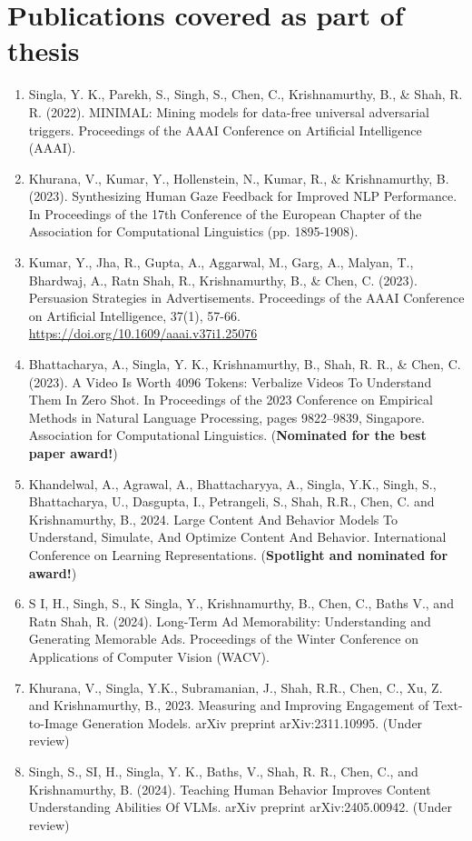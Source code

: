 \chapter*{Publications covered as part of thesis}
\begin{enumerate}
    \item Singla, Y. K., Parekh, S., Singh, S., Chen, C., Krishnamurthy, B., \& Shah, R. R. (2022). MINIMAL: Mining models for data-free universal adversarial triggers. Proceedings of the AAAI Conference on Artificial Intelligence (AAAI).

    \item Khurana, V., Kumar, Y., Hollenstein, N., Kumar, R., \& Krishnamurthy, B. (2023). Synthesizing Human Gaze Feedback for Improved NLP Performance. In Proceedings of the 17th Conference of the European Chapter of the Association for Computational Linguistics (pp. 1895-1908).
    
    \item Kumar, Y., Jha, R., Gupta, A., Aggarwal, M., Garg, A., Malyan, T., Bhardwaj, A., Ratn Shah, R., Krishnamurthy, B., \& Chen, C. (2023). Persuasion Strategies in Advertisements. Proceedings of the AAAI Conference on Artificial Intelligence, 37(1), 57-66. \url{https://doi.org/10.1609/aaai.v37i1.25076}

    \item Bhattacharya, A., Singla, Y. K., Krishnamurthy, B., Shah, R. R., \& Chen, C. (2023). A Video Is Worth 4096 Tokens: Verbalize Videos To Understand Them In Zero Shot. In Proceedings of the 2023 Conference on Empirical Methods in Natural Language Processing, pages 9822–9839, Singapore. Association for Computational Linguistics. (\textbf{Nominated for the best paper award!})

    \item Khandelwal, A., Agrawal, A., Bhattacharyya, A., Singla, Y.K., Singh, S., Bhattacharya, U., Dasgupta, I., Petrangeli, S., Shah, R.R., Chen, C. and Krishnamurthy, B., 2024. Large Content And Behavior Models To Understand, Simulate, And Optimize Content And Behavior. International Conference on Learning Representations. (\textbf{Spotlight and nominated for award!})

    \item  S I, H., Singh, S., K Singla, Y., Krishnamurthy, B., Chen, C., Baths V., and Ratn Shah, R. (2024). Long-Term Ad Memorability: Understanding and Generating Memorable Ads. Proceedings of the Winter Conference on Applications of Computer Vision (WACV).

    \item Khurana, V., Singla, Y.K., Subramanian, J., Shah, R.R., Chen, C., Xu, Z. and Krishnamurthy, B., 2023. Measuring and Improving Engagement of Text-to-Image Generation Models. arXiv preprint arXiv:2311.10995. (Under review)

    \item Singh, S., SI, H., Singla, Y. K., Baths, V., Shah, R. R., Chen, C., and Krishnamurthy, B. (2024). Teaching Human Behavior Improves Content Understanding Abilities Of VLMs. arXiv preprint arXiv:2405.00942. (Under review)

\end{enumerate}
